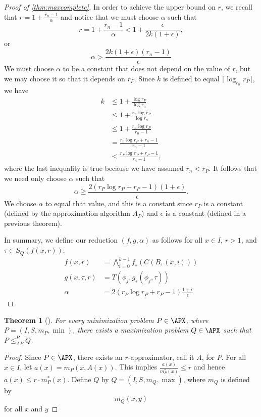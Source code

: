 \documentclass[]{article}
\theoremstyle{plain}
\newtheorem{theorem}{Theorem}
\theoremstyle{definition}
\newcommand{\APr}{\leq_{AP}^{P}}
\newcommand{\ceil}[1]{\lceil{#1}\rceil}
\begin{document}
\begin{proof}[Proof of \autoref{thm:maxcomplete}]
  In order to achieve the upper bound on $r$, we recall that $r = 1 + \frac{r_n - 1}{\alpha}$ and notice that we must choose $\alpha$ such that
  \begin{equation*}
    r = 1 + \frac{r_n - 1}{\alpha} < 1 + \frac{\epsilon}{2k(1 + \epsilon)},
  \end{equation*}
  or
  \begin{equation*}
    \alpha > \frac{2k(1 + \epsilon)(r_n - 1)}{\epsilon}
  \end{equation*}
  We must choose $\alpha$ to be a constant that does not depend on the value of $r$, but we may choose it so that it depends on $r_P$.
  Since $k$ is defined to equal $\ceil{\log_{r_n}{r_P}}$, we have
  \begin{align*}
    k & \leq 1 + \frac{\log{r_P}}{\log{r_n}} \\
    & \leq 1 + \frac{r_n \log{r_P}}{\log{r_n}} \\
    & \leq 1 + \frac{r_n \log{r_P}}{r_n - 1} \\
    & = \frac{r_n \log{r_P} + r_n - 1}{r_n - 1} \\
    & < \frac{r_P \log{r_P} + r_P - 1}{r_n - 1},
  \end{align*}
  where the last inequality is true because we have assumed $r_n < r_P$.
  It follows that we need only choose $\alpha$ such that
  \begin{equation*}
    \alpha \geq \frac{2(r_P \log{r_P} + r_P - 1)(1 + \epsilon)}{\epsilon}.
  \end{equation*}
  We choose $\alpha$ to equal that value, and this is a constant since $r_P$ is a constant (defined by the approximation algorithm $A_P$) and $\epsilon$ is a constant (defined in a previous theorem).

  In summary, we define our reduction $(f, g, \alpha)$ as follows for all $x \in I$, $r > 1$, and $\tau \in S_Q(f(x, r))$:
  \begin{align*}
    f(x, r) & = \bigwedge_{i = 0}^{k - 1}{f_s(C(B, (x, i)))} \\
    g(x, \tau, r) & = T(\phi_j, g_s(\phi_j, \tau)) \\
    \alpha & = 2(r_P \log{r_P} + r_P - 1)\frac{1 + \epsilon}{\epsilon}
  \end{align*}
\end{proof}

\begin{theorem}[{\cite[Theorem~8.7]{book}}]\label{thm:minmax}
  For every minimization problem $P \in \APX$, where $P = (I, S, m_P, \min)$, there exists a maximization problem $Q \in \APX$ such that $P \APr Q$.
\end{theorem}
\begin{proof}
  Since $P \in \APX$, there exists an $r$-approximator, call it $A$, for $P$.
  For all $x \in I$, let $a(x) = m_P(x, A(x))$.
  This implies $\frac{a(x)}{m^*_P(x)} \leq r$ and hence $a(x) \leq r \cdot m^*_P(x)$.
  Define $Q$ by $Q = (I, S, m_Q, \max)$, where $m_Q$ is defined by
  \begin{equation*}
    m_Q(x, y)
  \end{equation*}
  for all $x$ and $y$
\end{proof}
\end{document}
